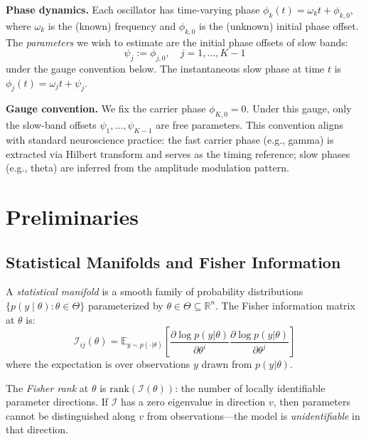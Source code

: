 \documentclass[12pt]{article}
\newcommand{\R}{\mathbb{R}}
\newcommand{\E}{\mathbb{E}}
\newcommand{\FIM}{\mathcal{I}}
\begin{document}
\noindent\textbf{Phase dynamics.} Each oscillator has time-varying phase $\phi_k(t) = \omega_k t + \phi_{k,0}$, where $\omega_k$ is the (known) frequency and $\phi_{k,0}$ is the (unknown) initial phase offset. The \emph{parameters} we wish to estimate are the initial phase offsets of slow bands:
\begin{equation}
\psi_j := \phi_{j,0}, \quad j = 1, \ldots, K-1
\label{eq:param_def}
\end{equation}
under the gauge convention below. The instantaneous slow phase at time $t$ is $\phi_j(t) = \omega_j t + \psi_j$.

\noindent\textbf{Gauge convention.} We fix the carrier phase $\phi_{K,0} = 0$. Under this gauge, only the slow-band offsets $\psi_1, \ldots, \psi_{K-1}$ are free parameters. This convention aligns with standard neuroscience practice: the fast carrier phase (e.g., gamma) is extracted via Hilbert transform and serves as the timing reference; slow phases (e.g., theta) are inferred from the amplitude modulation pattern.

\section{Preliminaries}

\subsection{Statistical Manifolds and Fisher Information}

A \emph{statistical manifold} is a smooth family of probability distributions $\{p(y \mid \theta) : \theta \in \Theta\}$ parameterized by $\theta \in \Theta \subseteq \R^n$. The Fisher information matrix at $\theta$ is:
\begin{equation}
\FIM_{ij}(\theta) = \E_{y \sim p(\cdot|\theta)}\left[\frac{\partial \log p(y|\theta)}{\partial \theta^i} \frac{\partial \log p(y|\theta)}{\partial \theta^j}\right]
\end{equation}
where the expectation is over observations $y$ drawn from $p(y|\theta)$.

The \emph{Fisher rank} at $\theta$ is $\mathrm{rank}(\FIM(\theta))$: the number of locally identifiable parameter directions. If $\FIM$ has a zero eigenvalue in direction $v$, then parameters cannot be distinguished along $v$ from observations---the model is \emph{unidentifiable} in that direction.
\end{document}
